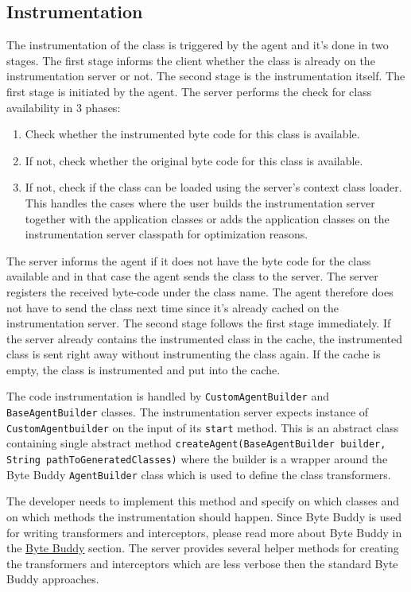 \subsection{Instrumentation}
The instrumentation of the class is triggered by the agent and it's done in two stages. The first stage informs the client whether the class is already on the instrumentation server or not. The second stage is the instrumentation itself. The first stage is initiated by the agent. The server performs the check for class availability in 3 phases:
\begin{enumerate}
	\item Check whether the instrumented byte code for this class is available.
	\item If not, check whether the original byte code for this class is available.
	\item If not, check if the class can be loaded using the server's context class loader. This handles the cases where the user builds the instrumentation server together with the application classes or adds the application classes on the instrumentation server classpath for optimization reasons.
\end{enumerate}

The server informs the agent if it does not have the byte code for the class available and in that case  the agent sends the class to the server. The server registers the received byte-code under the class name. The agent therefore does not have to send the class next time since it's already cached on the instrumentation server.
The second stage follows the first stage immediately. If the server already contains the instrumented class in the cache, the instrumented class is sent right away without instrumenting the class again. If the cache is empty, the class is instrumented and put into the cache.

The code instrumentation is handled by \texttt{CustomAgentBuilder} and \texttt{BaseAgentBuilder} classes.
The instrumentation server expects instance of \texttt{CustomAgentbuilder} on the input of its \texttt{start} method. This is an abstract class containing single abstract method \texttt{createAgent(BaseAgentBuilder builder, String pathToGeneratedClasses)} where the builder is a wrapper around the Byte Buddy \texttt{AgentBuilder} class which is used to define the class transformers.

The developer needs to implement this method and specify on which classes and on which methods the instrumentation should happen. Since Byte Buddy is used for writing transformers and interceptors, please read more about Byte Buddy in the \hyperref[sec:byte_buddy]{Byte Buddy} section. The server provides several helper methods for creating the transformers and interceptors which are less verbose then the standard Byte Buddy approaches.

